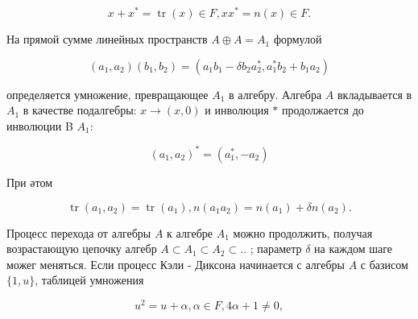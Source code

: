 \documentclass[10pt]{article}
\begin{document}
\[

x+x^{*}=\operatorname{tr}(x) \in F, x x^{*}=n(x) \in F .

\]



На прямой сумме линейных пространств $A \oplus A=A_{1}$ формулой



\[

\left(a_{1}, a_{2}\right)\left(b_{1}, b_{2}\right)=\left(a_{1} b_{1}-\delta b_{2} a_{2}^{*}, a_{1}^{*} b_{2}+b_{1} a_{2}\right)

\]



определяется умножение, превращающее $A_{1}$ в алгебру. Алгебра $A$ вкладывается в $A_{1}$ в качестве подалгебры: $x \rightarrow(x, 0)$ и инволюция $*$ продолжается до инволюции B $A_{1}:$



\[

\left(a_{1}, a_{2}\right)^{*}=\left(a_{1}^{*},-a_{2}\right)

\]



При әтом



\[

\operatorname{tr}\left(a_{1}, a_{2}\right)=\operatorname{tr}\left(a_{1}\right), n\left(a_{1} a_{2}\right)=n\left(a_{1}\right)+\delta n\left(a_{2}\right) .

\]



Процесс перехода от алгебры $A$ к алгебре $A_{1}$ можно продолжить, получая возрастающую цепочку алгебр $A \subset A_{1} \subset A_{2} \subset .$. ; параметр $\delta$ на каждом шаге можег меняться. Если процесс Кэли - Диксона начинается с алгебры $A$ с базисом $\{1, u\}$, таблицей умножения



\[

u^{2}=u+\alpha, \alpha \in F, 4 \alpha+1 \neq 0,

\]
\end{document}
